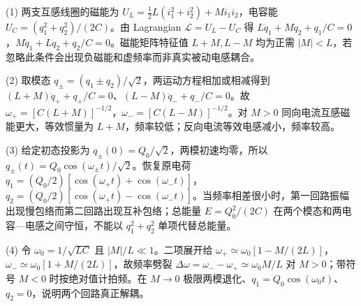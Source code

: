 (1) 两支互感线圈的磁能为 \(U_L=\frac12L(i_1^2+i_2^2)+Mi_1i_2\)，电容能 \(U_C=(q_1^2+q_2^2)/(2C)\)。由 Lagrangian \(\mathcal L=U_L-U_C\) 得 \(L\ddot q_1+M\ddot q_2+q_1/C=0\)，\(M\ddot q_1+L\ddot q_2+q_2/C=0\)。磁能矩阵特征值 \(L+M,L-M\) 均为正需 \(|M|<L\)，若忽略此条件会出现负磁能和虚频率而非真实被动电感耦合。

(2) 取模态 \(q_\pm=(q_1\pm q_2)/\sqrt2\)，两运动方程相加或相减得到 \((L+M)\ddot q_++q_+/C=0\)、\((L-M)\ddot q_-+q_-/C=0\)。故 \(\omega_+=[C(L+M)]^{-1/2}\)，\(\omega_-=[C(L-M)]^{-1/2}\)。对 \(M>0\) 同向电流互感磁能更大，等效惯量为 \(L+M\)，频率较低；反向电流等效电感减小，频率较高。

(3) 给定初态投影为 \(q_\pm(0)=Q_0/\sqrt2\)，两模初速均零，所以 \(q_\pm(t)=Q_0\cos(\omega_\pm t)/\sqrt2\)。恢复原电荷 \(q_1=(Q_0/2)[\cos(\omega_+t)+\cos(\omega_-t)]\)，\(q_2=(Q_0/2)[\cos(\omega_+t)-\cos(\omega_-t)]\)。当频率相差很小时，第一回路振幅出现慢包络而第二回路出现互补包络；总能量 \(E=Q_0^2/(2C)\) 在两个模态和两电容—电感之间守恒，不能以 \(q_1^2+q_2^2\) 单项代替总能量。

(4) 令 \(\omega_0=1/\sqrt{LC}\) 且 \(|M|/L\ll1\)。二项展开给 \(\omega_+\simeq\omega_0[1-M/(2L)]\)，\(\omega_-\simeq\omega_0[1+M/(2L)]\)，故频率劈裂 \(\Delta\omega=\omega_--\omega_+\simeq\omega_0M/L\) 对 \(M>0\)；带符号 \(M<0\) 时按绝对值计拍频。在 \(M\to0\) 极限两模退化、\(q_1=Q_0\cos(\omega_0t)\)、\(q_2=0\)，说明两个回路真正解耦。
